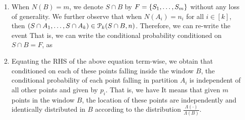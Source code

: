 \documentclass[letterpaper,10pt,english]{article}
\begin{document}
\begin{rem}
\begin{enumerate}[i\_]
\item 
When $N(B) = m$, we denote $S\cap B$ by $F = \left\{S_1, \dots, S_m\right\}$ without any loss of generality. 
We further observe that when $N(A_i) = n_i$ for all $i \in [k]$, 
then $(S \cap A_1, \dots, S \cap A_k) \in \mathcal{P}_k(S\cap B,n)$. 
Therefore, we can re-write the event 
That is, we can write the conditional probability conditioned on $S\cap B = F$, as 

\item   
Equating the RHS of the above equation term-wise, we obtain that conditioned on each of these points falling inside the window $B$, 
the conditional probability of each point falling in partition $A_i$ is independent of all other points and given by $p_i$. 
That is, we have 
It means that given $m$ points in the window $B$, the location of these points are independently and identically distributed in $B$ according to the distribution $\frac{\Lambda(\cdot)}{\Lambda(B)}$. 


\end{enumerate}
\end{rem}
\end{document}

